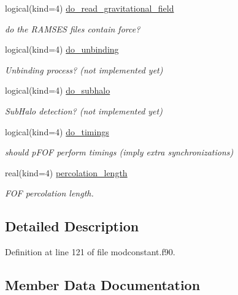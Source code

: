 \begin{DoxyCompactItemize}
logical(kind=4) \hyperlink{structmodconstant_1_1type__parameter__pfof_aa8c19ebe7cca7545effc17c2162557cb}{do\+\_\+read\+\_\+gravitational\+\_\+field}
\begin{DoxyCompactList}\small\item\em do the R\+A\+M\+S\+ES files contain force? \end{DoxyCompactList}\item 
logical(kind=4) \hyperlink{structmodconstant_1_1type__parameter__pfof_a4d8097905d8490a45d84b471ae1f5bb8}{do\+\_\+unbinding}
\begin{DoxyCompactList}\small\item\em Unbinding process? (not implemented yet) \end{DoxyCompactList}\item 
logical(kind=4) \hyperlink{structmodconstant_1_1type__parameter__pfof_a9f6178ca41c0ae971922f15f5399b2b5}{do\+\_\+subhalo}
\begin{DoxyCompactList}\small\item\em Sub\+Halo detection? (not implemented yet) \end{DoxyCompactList}\item 
logical(kind=4) \hyperlink{structmodconstant_1_1type__parameter__pfof_af646b4ae96b024905287fdb0b75305da}{do\+\_\+timings}
\begin{DoxyCompactList}\small\item\em should p\+F\+OF perform timings (imply extra synchronizations) \end{DoxyCompactList}\item 
real(kind=4) \hyperlink{structmodconstant_1_1type__parameter__pfof_aa62ddf1e2fd4d2d5d5f6fb9381268784}{percolation\+\_\+length}
\begin{DoxyCompactList}\small\item\em F\+OF percolation length. \end{DoxyCompactList}\end{DoxyCompactItemize}


\subsection{Detailed Description}


Definition at line 121 of file modconstant.\+f90.



\subsection{Member Data Documentation}
